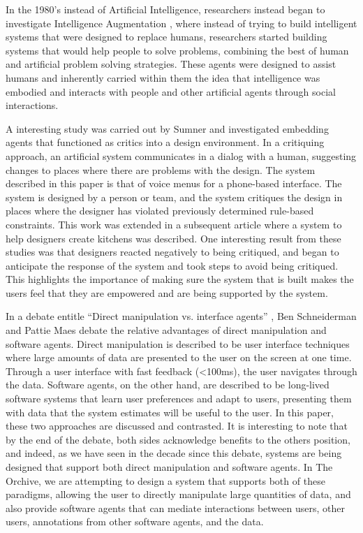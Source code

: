 In the 1980's instead of Artificial Intelligence, researchers instead
began to investigate Intelligence Augmentation \cite{fischer92}, where
instead of trying to build intelligent systems that were designed to
replace humans, researchers started building systems that would help
people to solve problems, combining the best of human and artificial
problem solving strategies.  These agents were designed to assist
humans and inherently carried within them the idea that intelligence
was embodied and interacts with people and other artificial agents
through social interactions.

A interesting study was carried out by Sumner \cite{sumner97} and
investigated embedding agents that functioned as critics into a design
environment.  In a critiquing approach, an artificial system
communicates in a dialog with a human, suggesting changes to places
where there are problems with the design.  The system described in
this paper is that of voice menus for a phone-based interface.  The
system is designed by a person or team, and the system critiques the
design in places where the designer has violated previously determined
rule-based constraints.  This work was extended in a subsequent
article \cite{fischer98a} where a system to help designers create
kitchens was described.  One interesting result from these studies was
that designers reacted negatively to being critiqued, and began to
anticipate the response of the system and took steps to avoid being
critiqued.  This highlights the importance of making sure the system
that is built makes the users feel that they are empowered and are
being supported by the system.

In a debate entitle ``Direct manipulation vs. interface agents''
\cite{schneiderman97}, Ben Schneiderman and Pattie Maes debate the
relative advantages of direct manipulation and software agents.
Direct manipulation is described to be user interface techniques where
large amounts of data are presented to the user on the screen at one
time.  Through a user interface with fast feedback (<100ms), the user
navigates through the data.  Software agents, on the other hand, are
described to be long-lived software systems that learn user
preferences and adapt to users, presenting them with data that the
system estimates will be useful to the user.  In this paper, these two
approaches are discussed and contrasted.  It is interesting to note
that by the end of the debate, both sides acknowledge benefits to the
others position, and indeed, as we have seen in the decade since this
debate, systems are being designed that support both direct
manipulation and software agents.  In The Orchive, we are attempting
to design a system that supports both of these paradigms, allowing the
user to directly manipulate large quantities of data, and also provide
software agents that can mediate interactions between users, other
users, annotations from other software agents, and the data.

